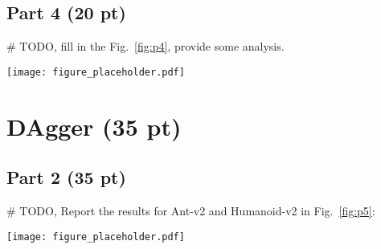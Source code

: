 \documentclass{article}
\newcommand{\fref}[1]{Fig.~\ref{#1}}
\begin{document}
\subsection{Part 4 (20 pt)}
\# TODO, fill in the \fref{fig:p4}, provide some analysis.

\begin{figure*}[!ht]
  \centering
  \texttt{[image: figure\_placeholder.pdf]}
  \caption{BC agent's performance varies with the value of ??? parameter in ??? environment.}
  \label{fig:p4}
\end{figure*}

\section{DAgger (35 pt)}
\subsection{Part 2 (35 pt)}
\# TODO, Report the results for Ant-v2 and Humanoid-v2 in \fref{fig:p5}:
\begin{figure*}[!ht]
  \centering
  \texttt{[image: figure\_placeholder.pdf]}
  \caption{Learning curve, plotting the number of DAgger iterations vs. the policy's mean return, with error bars to show the standard deviation. Please show the Ant-v2 environment on the left and the right part demonstrates Humanoid-v2 environment.}
  \label{fig:p5}
\end{figure*}
\end{document}
